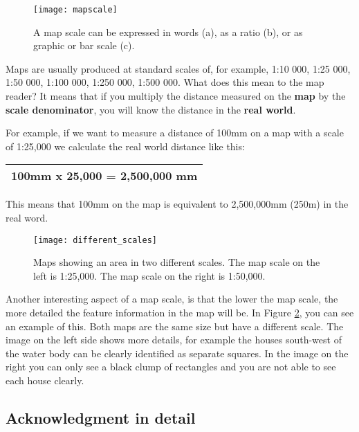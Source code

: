 \begin{figure}[ht]
   \begin{center}
   \caption{A map scale can be expressed in words (a), as a ratio (b), or as
graphic or bar scale (c).}
\label{fig:scales}\smallskip
   \texttt{[image: mapscale]}
\end{center}
\end{figure}

Maps are usually produced at standard scales of, for example, 1:10 000, 1:25
000, 1:50 000, 1:100 000, 1:250 000, 1:500 000. What does this mean to the
map reader? It means that if you multiply the distance measured on the
\textbf{map} by the \textbf{scale denominator}, you will know the distance in
the \textbf{real world}.

For example, if we want to measure a distance of 100mm on a map with a scale
of 1:25,000 we calculate the real world distance like this:

\begin{table}[ht]
\centering
 \begin{tabular}{|p{6cm}|}
 \hline
 100mm x 25,000 = 2,500,000 mm \\
 \hline
\end{tabular}
\end{table}

This means that 100mm on the map is equivalent to 2,500,000mm (250m) in the
real word. 

\begin{figure}[ht]
   \begin{center}
   \caption{Maps showing an area in two different scales. The map scale on
the left is 1:25,000. The map scale on the right is 1:50,000.}
\label{fig:diffscales}\smallskip
   \texttt{[image: different\_scales]}
\end{center}
\end{figure}

Another interesting aspect of a map scale, is that the lower the map scale,
the more detailed the feature information in the map will be. In Figure
\ref{fig:diffscales}, you can see an example of this. Both maps are the same
size but have
a different scale. The image on the left side shows more details, for example
the houses south-west of the water body can be clearly identified as separate
squares. In the image on the right you can only see a black clump of
rectangles and you are not able to see each house clearly.

\subsection{Acknowledgment in detail}

